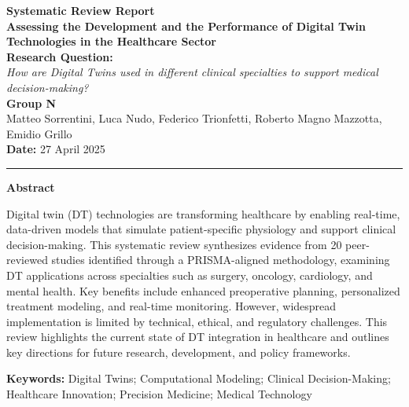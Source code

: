 \documentclass[10pt,a4paper]{article}
\begin{document}
\begin{center}
    {\LARGE \bfseries Systematic Review Report}\\[8pt]
    {\Huge \bfseries Assessing the Development and the Performance of Digital Twin Technologies in the Healthcare Sector}\\[15pt]
    {\large \textbf{Research Question:}}\\[2pt]
    {\large \itshape How are Digital Twins used in different clinical specialties to support medical decision-making?}\\[15pt]
    {\large \textbf{Group N}}\\[5pt]
    Matteo Sorrentini, Luca Nudo, Federico Trionfetti, Roberto Magno Mazzotta, Emidio Grillo\\[10pt]
    {\normalsize \textbf{Date:} 27 April 2025}
\end{center}

\vspace{6em}

\vspace{1em}
\hrule
\vspace{2em}

\begin{center}
    {\Large \textbf{Abstract}} %
\end{center}

\begin{center}
\begin{minipage}{0.85\textwidth}
\noindent
Digital twin (DT) technologies are transforming healthcare by enabling real-time, data-driven models that simulate patient-specific physiology and support clinical decision-making. This systematic review synthesizes evidence from 20 peer-reviewed studies identified through a PRISMA-aligned methodology, examining DT applications across specialties such as surgery, oncology, cardiology, and mental health. Key benefits include enhanced preoperative planning, personalized treatment modeling, and real-time monitoring. However, widespread implementation is limited by technical, ethical, and regulatory challenges. This review highlights the current state of DT integration in healthcare and outlines key directions for future research, development, and policy frameworks.
\vspace{1em}

\textbf{Keywords:} Digital Twins; Computational Modeling; Clinical Decision-Making; Healthcare Innovation; Precision Medicine; Medical Technology
\end{minipage}
\end{center}
\end{document}
